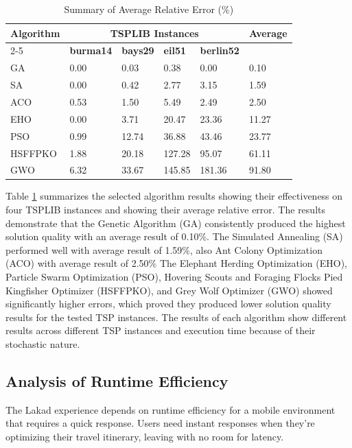 \begin{table}[H]
	\centering
	\singlespacing
	\caption{Summary of Average Relative Error (\%)}
	\label{tab:acc} \renewcommand{\arraystretch}{1.2}
	\begin{tabularx}{\linewidth}{XXXXXX}
		\toprule
        \multirow{2}{*}{\textbf{Algorithm}} & \multicolumn{4}{c}{\textbf{TSPLIB Instances}} & \multirow{2}{*}{\textbf{Average}} \\
        \cmidrule(lr){2-5}
         & \textbf{burma14} & \textbf{bays29} & \textbf{eil51} & \textbf{berlin52} &  \\
		\midrule
        GA & 0.00 & 0.03 & 0.38 & 0.00 & 0.10 \\
        SA & 0.00 & 0.42 & 2.77 & 3.15 & 1.59 \\
        ACO & 0.53 & 1.50 &  5.49 &  2.49 & 2.50 \\
        EHO & 0.00 & 3.71 &  20.47 &  23.36 & 11.27 \\
        PSO & 0.99 & 12.74 &  36.88 &   43.46 & 23.77 \\
        HSFFPKO & 1.88 &  20.18 &  127.28 &  95.07 & 61.11 \\
        GWO & 6.32 & 33.67 & 145.85 & 181.36 & 91.80 \\
		\bottomrule
	\end{tabularx}
\end{table}

Table \ref{tab:acc} summarizes the selected algorithm results showing their effectiveness on four TSPLIB instances and showing their average relative error. The results demonstrate that the Genetic Algorithm (GA) consistently produced the highest solution quality with an average result of 0.10\%. The Simulated Annealing (SA) performed well with average result of 1.59\%, also Ant Colony Optimization (ACO) with average result of 2.50\% The Elephant Herding Optimization (EHO), Particle Swarm Optimization (PSO), Hovering Scouts and Foraging Flocks Pied Kingfisher Optimizer (HSFFPKO), and Grey Wolf Optimizer (GWO) showed significantly higher errors, which proved they produced lower solution quality results for the tested TSP instances. The results of each algorithm show different results across different TSP instances and execution time because of their stochastic nature.


\subsection{Analysis of Runtime Efficiency}
The Lakad experience depends on runtime efficiency for a mobile environment that requires a quick response. Users need instant responses when they’re optimizing their travel itinerary, leaving with no room for latency.

